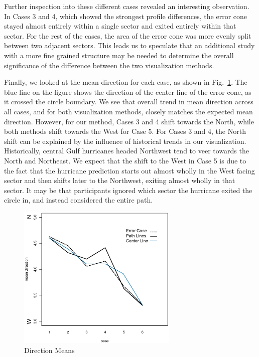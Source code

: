 \documentclass[journal]{vgtc}                %
\begin{document}

Further inspection into these different cases revealed an interesting observation. In Cases 3 and 4, which showed the
strongest profile differences,  the error cone stayed almost entirely within a single sector and exited entirely within that sector. For the rest of the cases, the area of the error cone was more evenly split between two adjacent sectors. This leads us to speculate that an additional study with a more fine grained structure may be needed to determine the overall significance of the difference between the two visualization methods.

Finally, we looked at the mean direction for each case, as shown in Fig.~\ref{fig:dirMean}. The blue line on the figure
shows the direction of the center line of the error cone, as it crossed the circle boundary. We see that overall trend in mean direction across all cases, and for both visualization methods, closely matches the expected mean direction.
However, for our method, Cases 3 and 4 shift towards the North, while both methods shift towards the West for Case 5.
For Cases 3 and 4, the North shift can be explained by the influence of historical trends in our visualization. 
Historically, central Gulf hurricanes headed Northwest tend to veer towards the North and Northeast. We expect
that the shift to the West in Case 5 is due to the fact that the hurricane prediction starts out almost wholly in the West
facing sector and then shifts later to the Northwest, exiting almost wholly in that sector. It may be that participants
ignored which sector the hurricane exited the circle in, and instead considered the entire path.

\begin{figure}[t]
 \centering
   \includegraphics[width=3.0in]{figures/mean-plot.eps}
  \caption{Direction Means}
 \label{fig:dirMean}
\end{figure}
\end{document}
